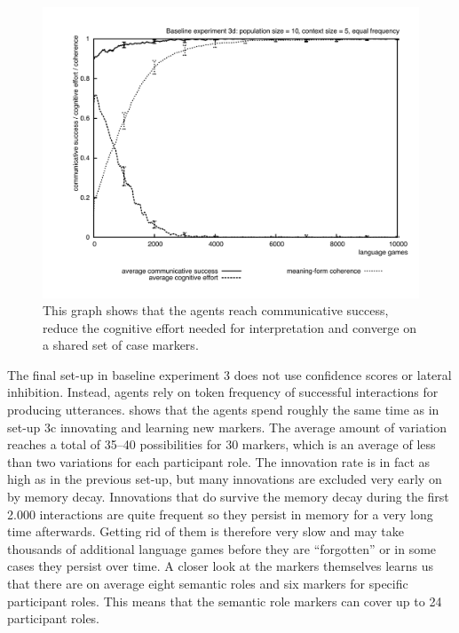 \begin{figure}[b]
\centerline{\includegraphics[width=\textwidth]{Chapter3/figs/graph-base3-effort3d}}
  \caption[Baseline experiment 3d: success, effort and coherence]{This graph shows that the agents reach communicative success, reduce the cognitive effort needed for interpretation and converge on a shared set of case markers.}
   \label{f:base3-effort3d}
\end{figure}

 The final set-up in baseline experiment 3 does not use confidence scores or lateral inhibition. Instead, agents rely on token frequency of successful interactions for producing utterances.  shows that the agents spend roughly the same time as in set-up 3c innovating and learning new markers. The average amount of variation reaches a total of 35--40 possibilities for 30 markers, which is an average of less than two variations for each participant role. The innovation rate is in fact as high as in the previous set-up, but many innovations are excluded very early on by memory decay. Innovations that do survive the memory decay during the first 2.000 interactions are quite frequent so they persist in memory for a very long time afterwards. Getting rid of them is therefore very slow and may take thousands of additional language games before they are ``forgotten'' or in some cases they persist over time. A closer look at the markers themselves learns us that there are on average eight semantic roles and six markers for specific participant roles. This means that the semantic role markers can cover up to 24 participant roles.

